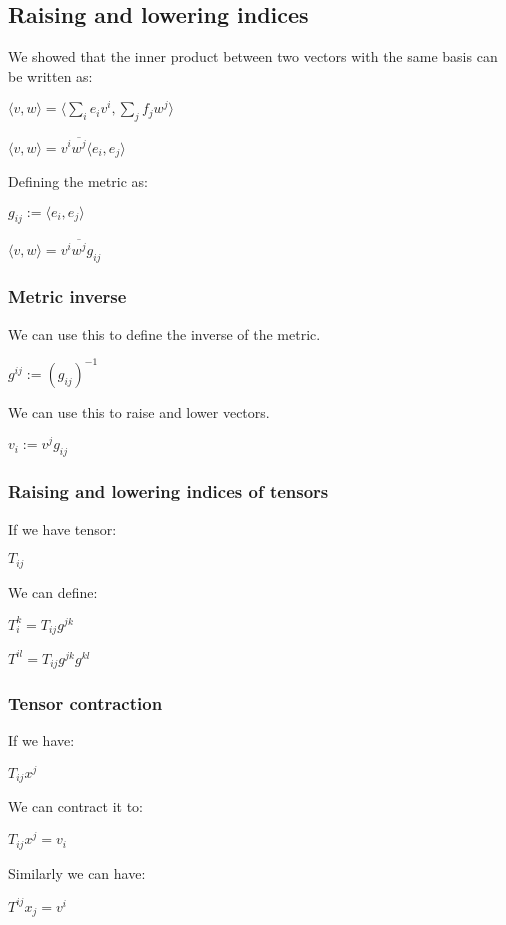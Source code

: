
\subsection{Raising and lowering indices}

We showed that the inner product between two vectors with the same basis can be written as:

\(\langle v, w\rangle =\langle \sum_i e_iv^i, \sum_j f_jw^j\rangle \)

\(\langle v, w\rangle =v^i\overline {w^j}\langle e_i, e_j\rangle\)

Defining the metric as:

\(g_{ij}:=\langle e_i,e_j\rangle \)

\(\langle v, w\rangle =v^i\overline {w^j}g_{ij}\)

\subsubsection{Metric inverse}

We can use this to define the inverse of the metric.

\(g^{ij}:=(g_{ij})^{-1}\)

We can use this to raise and lower vectors.

\(v_i:=v^jg_{ij}\)

\subsubsection{Raising and lowering indices of tensors}

If we have tensor:

\(T_{ij}\)

We can define:

\(T_i^k=T_{ij}g^{jk}\)

\(T^{il}=T_{ij}g^{jk}g^{kl}\)

\subsubsection{Tensor contraction}

If we have:

\(T_{ij}x^j\)

We can contract it to:

\(T_{ij}x^j=v_i\)

Similarly we can have:

\(T^{ij}x_j=v^i\)

